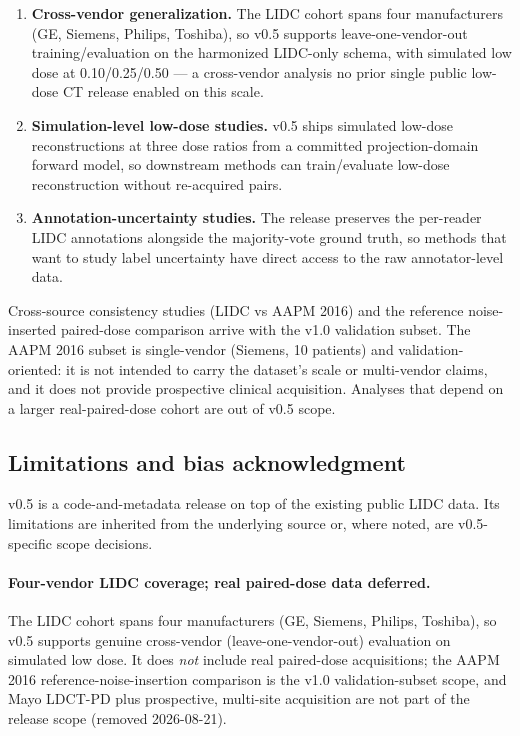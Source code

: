\documentclass[twoside,11pt]{article}
\begin{document}
\begin{enumerate}
    \item \textbf{Cross-vendor generalization.} The LIDC cohort spans four manufacturers (GE, Siemens, Philips, Toshiba), so v0.5 supports leave-one-vendor-out training/evaluation on the harmonized LIDC-only schema, with simulated low dose at 0.10/0.25/0.50 --- a cross-vendor analysis no prior single public low-dose CT release enabled on this scale.
    \item \textbf{Simulation-level low-dose studies.} v0.5 ships simulated low-dose reconstructions at three dose ratios from a committed projection-domain forward model, so downstream methods can train/evaluate low-dose reconstruction without re-acquired pairs.
    \item \textbf{Annotation-uncertainty studies.} The release preserves the per-reader LIDC annotations alongside the majority-vote ground truth, so methods that want to study label uncertainty have direct access to the raw annotator-level data.
\end{enumerate}

Cross-source consistency studies (LIDC vs AAPM 2016) and the reference noise-inserted paired-dose comparison arrive with the v1.0 validation subset. The AAPM 2016 subset is single-vendor (Siemens, 10 patients) and validation-oriented: it is not intended to carry the dataset's scale or multi-vendor claims, and it does not provide prospective clinical acquisition. Analyses that depend on a larger real-paired-dose cohort are out of v0.5 scope.

\subsection*{Limitations and bias acknowledgment}

v0.5 is a code-and-metadata release on top of the existing public LIDC data. Its limitations are inherited from the underlying source or, where noted, are v0.5-specific scope decisions.

\paragraph{Four-vendor LIDC coverage; real paired-dose data deferred.} The LIDC cohort spans four manufacturers (GE, Siemens, Philips, Toshiba), so v0.5 supports genuine cross-vendor (leave-one-vendor-out) evaluation on simulated low dose. It does \emph{not} include real paired-dose acquisitions; the AAPM 2016 reference-noise-insertion comparison is the v1.0 validation-subset scope, and Mayo LDCT-PD plus prospective, multi-site acquisition are not part of the release scope (removed 2026-08-21).
\end{document}
